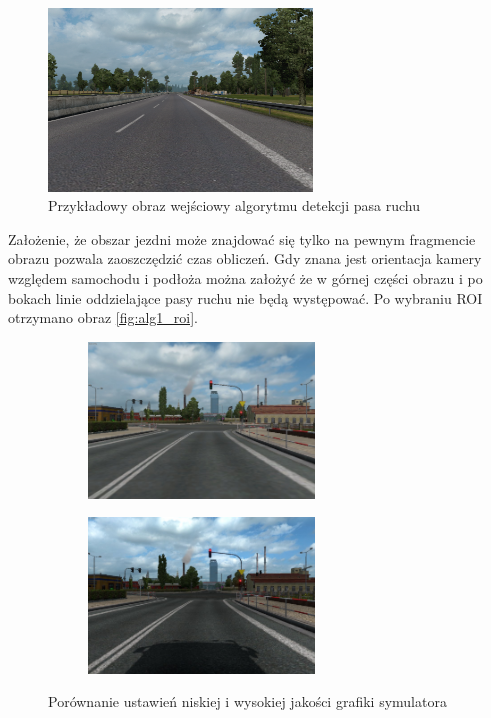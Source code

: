 \begin{figure}
  \centering
  \includegraphics[width=7cm]{img/input.png}
  \caption{Przykładowy obraz wejściowy algorytmu detekcji pasa ruchu}
  \label{fig:inputimg2}
\end{figure}
  
Założenie, że obszar jezdni może znajdować się tylko na pewnym fragmencie obrazu pozwala zaoszczędzić czas obliczeń. 
Gdy znana jest orientacja kamery względem samochodu i podłoża można założyć że w górnej części obrazu i po bokach linie oddzielające pasy ruchu nie będą występować.
Po wybraniu ROI otrzymano obraz \ref{fig:alg1_roi}.


\begin{figure}[h]
	\centering
	\begin{subfigure}{0.35\textwidth}
		\centering
		\includegraphics[width=6cm]{img/low_details.jpg}
		\subcaption{\label{fig:low_details}}
	\end{subfigure}
	\begin{subfigure}{0.35\textwidth}
		\centering
		\includegraphics[width=6cm]{img/high_details.jpg}
		\subcaption{\label{fig:high_details}}
	\end{subfigure}
	
	\caption{\label{fig:details1}Porównanie ustawień niskiej \protect{} i wysokiej \protect{} jakości grafiki symulatora}
\end{figure}


